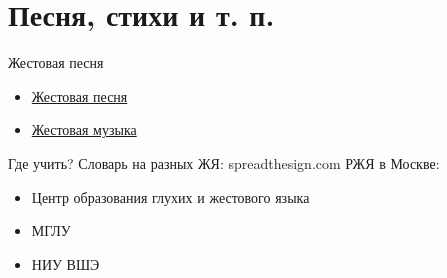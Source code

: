 \documentclass[13pt, t]{beamer}
\begin{document}
\section{Песня, стихи и т. п.} %
\begin{frame}{Жестовая песня}
\begin{itemize}
    \item \href{https://www.youtube.com/watch?v=n-lNtm1lKsw}{Жестовая песня}
    \item \href{https://youtu.be/EuD2iNVMS_4?t=285}{Жестовая музыка}
\end{itemize}
\end{frame}

\begin{frame}{Где учить?}
Словарь на разных ЖЯ: spreadthesign.com
РЖЯ в Москве:
\begin{itemize}
    \item Центр образования глухих и жестового языка
    \item МГЛУ
    \item НИУ ВШЭ
\end{itemize}

\end{frame}

\end{document}
